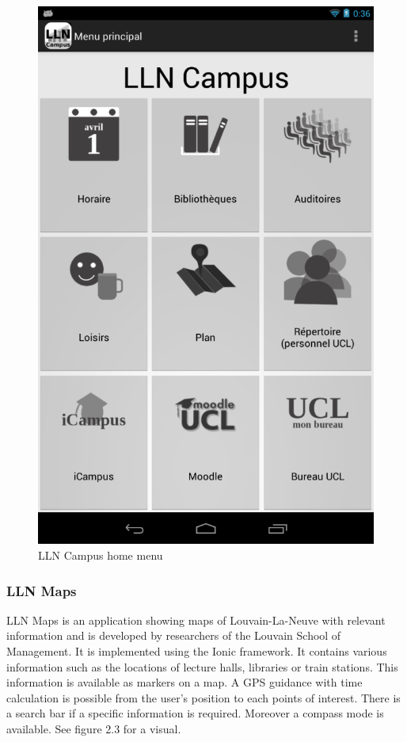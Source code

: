 \documentclass{eplmastersthesis}
\begin{document}
\begin{figure}[H]
\centering
\includegraphics[scale = 0.2]{Images/llncampus.png}
\caption{LLN Campus home menu}
\end{figure}

\newpage

\subsubsection{LLN Maps}
LLN Maps is an application showing maps of Louvain-La-Neuve with relevant information and is developed by researchers of the Louvain School of Management. It is implemented using the Ionic framework. It contains various information such as the locations of lecture halls, libraries or train stations. This information is available as markers on a map. A GPS guidance with time calculation is possible from the user's position to each points of interest. There is a search bar if a specific information is required. Moreover a compass mode is available. See figure 2.3 for a visual.
\end{document}
